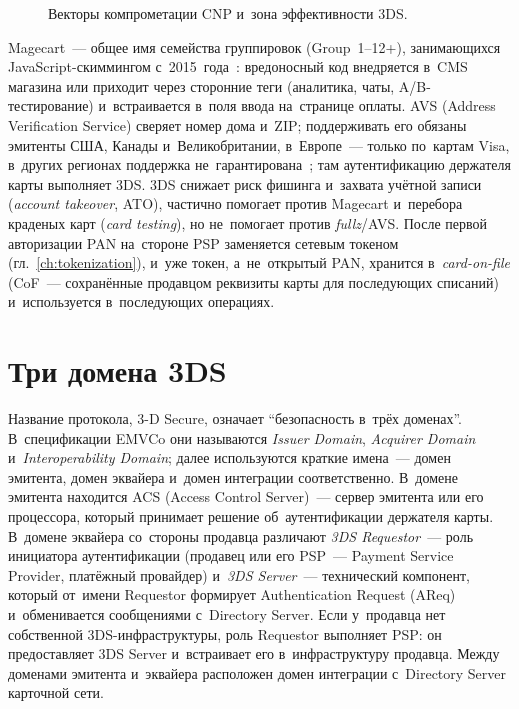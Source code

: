 \begin{figure}[tbp]
  \centering
  \caption{Векторы компрометации CNP и~зона эффективности 3DS.}%
  \label{fig:cnp-attack-surface}
\end{figure}

Magecart~--- общее имя семейства группировок (Group~1--12+), занимающихся
JavaScript-скиммингом с~2015~года~\cite{cert-eu-magecart-2020}: вредоносный код внедряется в~CMS магазина или
приходит через сторонние теги (аналитика, чаты, A/B-тестирование) и~встраивается
в~поля ввода на~странице оплаты. AVS (Address Verification Service) сверяет номер дома
и~ZIP; поддерживать его обязаны эмитенты США, Канады и~Великобритании, в~Европе~---
только по~картам Visa, в~других регионах поддержка не~гарантирована~\cite{adyen-avs}; там
аутентификацию держателя карты выполняет 3DS. 3DS снижает риск фишинга
и~захвата учётной записи (\textit{account takeover}, ATO), частично помогает против Magecart и~перебора краденых карт (\textit{card testing}), но не~помогает против
\textit{fullz}/AVS. После
первой авторизации PAN на~стороне PSP заменяется сетевым токеном
(гл.~\ref{ch:tokenization}), и~уже токен, а~не~открытый PAN, хранится
в~\textit{card-on-file} (CoF~--- сохранённые продавцом реквизиты карты для последующих
списаний) и~используется в~последующих операциях.

\section{Три домена 3DS}\label{sec:3ds-three-domains}

Название протокола, 3-D Secure, означает \enquote{безопасность в~трёх
доменах}. В~спецификации EMVCo они называются \textit{Issuer Domain},
\textit{Acquirer Domain} и~\textit{Interoperability Domain}; далее используются
краткие имена~--- домен эмитента, домен эквайера и~домен интеграции
соответственно. В~домене эмитента находится ACS (Access Control Server)~---
сервер эмитента или его процессора, который принимает решение об~аутентификации
держателя карты. В~домене эквайера со~стороны продавца различают \textit{3DS
Requestor}~--- роль инициатора аутентификации (продавец или его
PSP~--- Payment Service Provider, платёжный провайдер) и~\textit{3DS
Server}~--- технический компонент, который от~имени Requestor формирует
Authentication Request (AReq) и~обменивается сообщениями с~Directory Server.
Если у~продавца нет собственной 3DS-инфраструктуры, роль Requestor выполняет
PSP: он предоставляет 3DS Server и~встраивает его в~инфраструктуру продавца. Между доменами эмитента
и~эквайера расположен домен интеграции с~Directory Server карточной сети.


